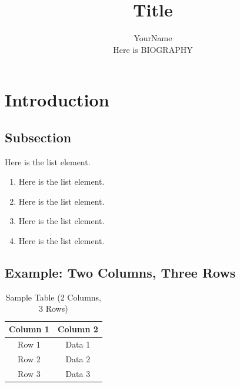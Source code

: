 \documentclass[12pt,journal,compsoc]{IEEEtran}
\begin{document}
\title{Title}
\author{YourName\\
        \small{Here is BIOGRAPHY}}
\date{}

  
\maketitle


\section{Introduction}


\subsection{Subsection}

Here is the list element. 
\begin{enumerate}
  \item Here is the list element.  
  \item Here is the list element. 
  \item Here is the list element.  
  \item Here is the list element. 
\end{enumerate}

\subsection{Example: Two Columns, Three Rows}
\begin{table}[h]
  \renewcommand{\arraystretch}{1.2}
  \caption{Sample Table (2 Columns, 3 Rows)}
  \label{table:sample}
  \centering
  \begin{tabular}{|c|c|}
  \hline
  \textbf{Column 1} & \textbf{Column 2}\\
  \hline
  Row 1 & Data 1\\
  \hline
  Row 2 & Data 2\\
  \hline
  Row 3 & Data 3\\
  \hline
  \end{tabular}
\end{table}
\end{document}
